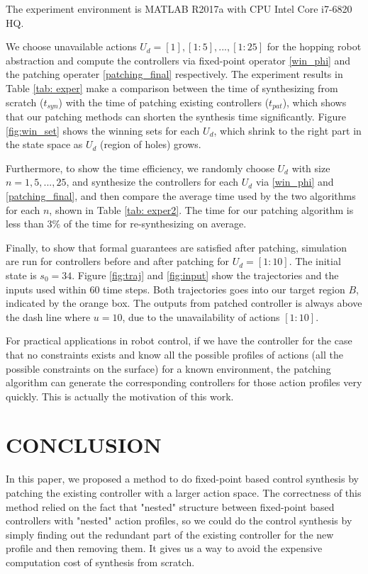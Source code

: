 The experiment environment is MATLAB R2017a with CPU Intel Core  i7-6820 HQ.

We choose unavailable actions $ U_d= [1],[1:5],...,[1:25] $ for the hopping robot abstraction and compute the controllers via fixed-point operator \eqref{win_phi} and the patching operater \eqref{patching_final} respectively.  The experiment results in Table \ref{tab: exper} make a comparison between the time of synthesizing from scratch ($ t_{syn} $) with the time of patching existing controllers ($ t_{pat} $), which shows that our patching methods can shorten the synthesis time significantly. Figure \ref{fig:win_set} shows the winning sets for each $ U_d $, which shrink to the right part in the state space as $ U_d $ (region of holes) grows.

Furthermore, to show the time efficiency, we randomly choose $ U_d $ with size $n = 1,5,...,25 $, and synthesize the controllers for each $ U_d $ via \eqref{win_phi} and \eqref{patching_final}, and then compare the average time used by the two algorithms for each $ n $, shown in Table \ref{tab: exper2}. The time for our patching algorithm is less than $ 3\% $ of the time for re-synthesizing on average.

Finally, to show that formal guarantees are satisfied after patching, simulation are run for controllers before and after patching for $ U_d =[1:10]$. The initial state is $ s_0=34 $. Figure \ref{fig:traj} and \ref{fig:input} show the trajectories and the inputs used within $ 60 $ time steps. Both trajectories goes into our target region $ B $, indicated by the orange box. The outputs from patched controller is always above the dash line where $ u=10 $, due to the unavailability of actions $[1:10] $.

For practical applications in robot control, if we have the controller for the case that no constraints exists and know all the possible profiles of actions (all the possible constraints on the surface) for a known environment, the patching algorithm can generate the corresponding controllers for those action profiles very quickly. This is actually the motivation of this work.

\section{CONCLUSION}
In this paper, we proposed a method to do fixed-point based control synthesis by patching the existing controller with a larger action space. The correctness of this method relied on the fact that "nested" structure between fixed-point based controllers with "nested" action profiles, so we could do the control synthesis by simply finding out the redundant part of the existing controller for the new profile and then removing them. It gives us a way to avoid the expensive computation cost of synthesis from scratch. 

